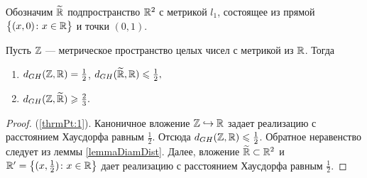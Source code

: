 Обозначим \( \widetilde {\mathbb R} \) подпространство \( \mathbb R^2 \) с метрикой
\( l_1 \), состоящее из прямой \( \big\{(x,0) \colon x\in \mathbb R\big\} \)
и точки \( (0,1) \).
\begin{theorem}
  Пусть \( {\mathbb Z} \) --- метрическое  пространство целых чисел с метрикой
  из \( \mathbb R \). Тогда
  \begin{enumerate}
    \item \( d_{GH}({\mathbb Z}, \mathbb R) = \frac 1 2 \), \( d_{GH}(\widetilde {\mathbb R},
      \mathbb R)\leqslant \frac 1 2 , \)\label{thrmPt:1}
    \item \( d_{GH}({\mathbb Z}, \widetilde {\mathbb R}) \geqslant \frac 2 3 . \)\label{thrmPt:2}
  \end{enumerate}
  \label{thrmRUltraMetric}
\end{theorem}
\begin{proof}
  (\ref{thrmPt:1}). Каноничное вложение \( {\mathbb Z} \hookrightarrow \mathbb R \)
  задает реализацию с расстоянием Хаусдорфа равным \( \frac 1 2 \).
  Отсюда \( d_{GH}({\mathbb Z},\mathbb R) \leqslant \frac 1 2 \). Обратное неравенство
  следует из леммы \ref{lemmaDiamDist}. Далее, вложение \( \widetilde
  {\mathbb R} \subset \mathbb R^2 \) и \( \mathbb R' = \left\{(x,\frac 1 2) \colon x \in \mathbb R\right\} \)
  дает реализацию с расстоянием Хаусдорфа равным \( \frac 1 2 \).


\end{proof}
